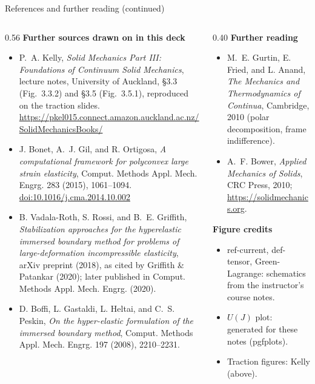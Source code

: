 \documentclass[aspectratio=169,11pt]{beamer}
\begin{document}
\begin{frame}{References and further reading (continued)}
\scriptsize
\begin{columns}[T,onlytextwidth]
\begin{column}{0.56\textwidth}
\textbf{Further sources drawn on in this deck}
\begin{itemize}\itemsep4pt
  \item P.~A. Kelly, \emph{Solid Mechanics Part III: Foundations of Continuum Solid Mechanics}, lecture notes, University of Auckland, \S3.3 (Fig.~3.3.2) and \S3.5 (Fig.~3.5.1), reproduced on the traction slides.\\
  \url{https://pkel015.connect.amazon.auckland.ac.nz/SolidMechanicsBooks/}
  \item J. Bonet, A.~J. Gil, and R. Ortigosa, \emph{A computational framework for polyconvex large strain elasticity}, Comput. Methods Appl. Mech. Engrg. 283 (2015), 1061--1094.\\
  \href{https://doi.org/10.1016/j.cma.2014.10.002}{doi:10.1016/j.cma.2014.10.002}
  \item B. Vadala-Roth, S. Rossi, and B.~E. Griffith, \emph{Stabilization approaches for the hyperelastic immersed boundary method for problems of large-deformation incompressible elasticity}, arXiv preprint (2018), as cited by Griffith \& Patankar (2020); later published in Comput. Methods Appl. Mech. Engrg. (2020).
  \item D. Boffi, L. Gastaldi, L. Heltai, and C.~S. Peskin, \emph{On the hyper-elastic formulation of the immersed boundary method}, Comput. Methods Appl. Mech. Engrg. 197 (2008), 2210--2231.
\end{itemize}
\end{column}
\begin{column}{0.40\textwidth}
\textbf{Further reading}
\begin{itemize}\itemsep4pt
  \item M.~E. Gurtin, E. Fried, and L. Anand, \emph{The Mechanics and Thermodynamics of Continua}, Cambridge, 2010 (polar decomposition, frame indifference).
  \item A.~F. Bower, \emph{Applied Mechanics of Solids}, CRC Press, 2010; \url{https://solidmechanics.org}.
\end{itemize}
\textbf{Figure credits}
\begin{itemize}\itemsep4pt
  \item ref-current, def-tensor, Green-Lagrange: schematics from the instructor's course notes.
  \item \(U(J)\) plot: generated for these notes (pgfplots).
  \item Traction figures: Kelly (above).
\end{itemize}
\end{column}
\end{columns}
\end{frame}
\end{document}
